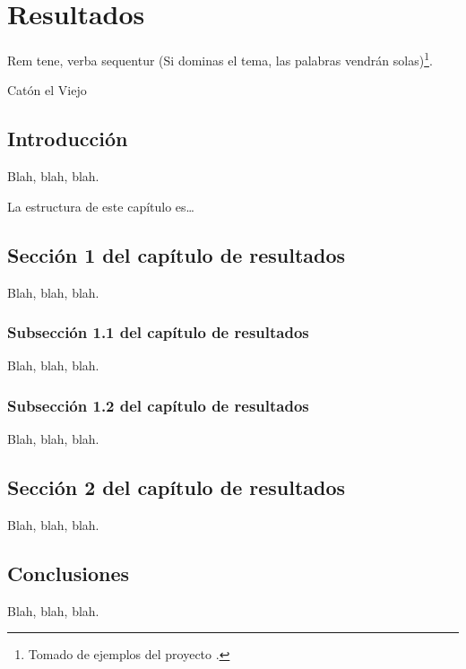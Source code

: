 %

\chapter{Resultados}
\label{cha:resultados}


\begin{FraseCelebre}
  \begin{Frase}
    Rem tene, verba sequentur (Si dominas el tema, las palabras vendrán
    solas)\footnote{Tomado de ejemplos del proyecto \texis{}.}.
  \end{Frase}
  \begin{Fuente}
    Catón el Viejo
  \end{Fuente}
\end{FraseCelebre}

\section{Introducción}
\label{sec:results-introduction}

Blah, blah, blah.

La estructura de este capítulo es\ldots


\section{Sección 1 del capítulo de resultados}
\label{sec:results-1}

Blah, blah, blah.


\subsection{Subsección 1.1 del capítulo de resultados}
\label{sec:results-11}

Blah, blah, blah.


\subsection{Subsección 1.2 del capítulo de resultados}
\label{sec:results-12}

Blah, blah, blah.




\section{Sección 2 del capítulo de resultados}
\label{sec:results-2}

Blah, blah, blah.




\section{Conclusiones}
\label{sec:results-conclusions}

Blah, blah, blah.



